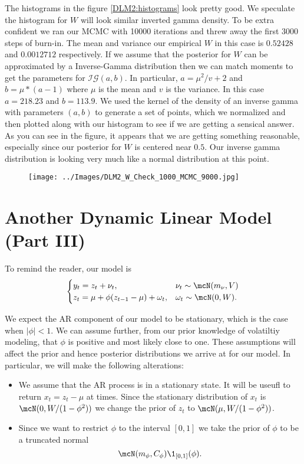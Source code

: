 \documentclass{article}
\begin{document}
The histograms in the figure \ref{DLM2:histograms} look pretty good.  We speculate the histogram for $W$ will look similar inverted gamma density.  To be extra confident we ran our MCMC with 10000 iterations and threw away the first 3000 steps of burn-in.  The mean and variance our empirical $W$ in this case is $0.52428$ and $0.0012712$ respectively.  If we assume that the posterior for $W$ can be approximated by a Inverse-Gamma distribution then we can match moments to get the parameters for $\mathcal{IG}(a,b)$.  In particular, $a = \mu^2/v + 2$ and $b = \mu*(a-1)$ where $\mu$ is the mean and $v$ is the variance.  In this case $a = 218.23$ and $b = 113.9$.  We used the kernel of the density of an inverse gamma with parameters $(a,b)$ to generate a set of points, which we normalized and then plotted along with our histogram to see if we are getting a sensical answer.  As you can see in the figure, it appears that we are getting something reasonable, especially since our posterior for $W$ is centered near $0.5$.  Our inverse gamma distribution is looking very much like a normal distribution at this point.

\begin{figure}[!h]
\begin{center}
\texttt{[image: ../Images/DLM2\_W\_Check\_1000\_MCMC\_9000.jpg]}
\end{center}
\end{figure}

\section{Another Dynamic Linear Model (Part III)}

To remind the reader, our model is
\[
\begin{cases}
y_t = z_t + \nu_t, & \nu_t \sim \mcN(m_\nu, V) \\
z_t = \mu + \phi (z_{t-1} - \mu) + \omega_t, & \omega_t \sim \mcN(0, W).
\end{cases}
\]

We expect the AR component of our model to be stationary, which is the case when $|\phi| < 1$.  We can assume further, from our prior knowledge of volatiltiy modeling, that $\phi$ is positive and most likely close to one.  These assumptions will affect the prior and hence posterior distributions we arrive at for our model.  In particular, we will make the following alterations:
\begin{itemize}
\item We assume that the AR process is in a stationary state.  It will be useufl to return $x_t = z_t - \mu$ at times.  Since the stationary distribution of $x_t$ is $\mcN(0, W/(1-\phi^2))$ we change the prior of $z_t$ to $\mcN(\mu, W / (1-\phi^2))$.
\item Since we want to restrict $\phi$ to the interval $[0,1]$ we take the prior of $\phi$ to be a truncated normal
\[
\mcN(m_\phi, C_\phi) \1_{[0,1]}(\phi).
\]
\end{itemize}
\end{document}
